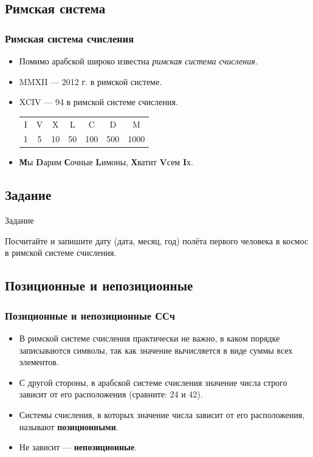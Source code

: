 \documentclass[compress,red]{beamer}
\begin{document}
\subsection{Римская система}
\begin{frame}[fragile]
  \frametitle{Римская система счисления}
  \begin{itemize}
    \item Помимо арабской широко известна \emph{римская система счисления}.
    \item MMXII --- 2012 г. в римской системе.
    \item XCIV --- 94 в римской системе счисления.
    
    \begin{table}
      \begin{tabular}{ccccccc}
      I & V & X & L & C & D & M \\
      1 & 5 & 10 & 50 & 100 & 500 & 1000 \\
      \end{tabular}
    \end{table}
    
    \item \textbf{М}ы \textbf{D}арим \textbf{С}очные \textbf{L}имоны, \textbf{Х}ватит \textbf{V}сем \textbf{I}х.
  \end{itemize}
\end{frame}

\subsection{Задание}
\begin{frame}
  \begin{center}
    \Huge{Задание}
  \end{center}
  \begin{center}
    \Large{Посчитайте и запишите дату (дата, месяц, год) полёта первого человека в космос в римской системе счисления.}
  \end{center}
\end{frame}

\subsection{Позиционные и непозиционные}
\begin{frame}[fragile]
  \frametitle{Позиционные и непозиционные ССч}
  \begin{itemize}
    \item В римской системе счисления практически не важно, в каком порядке записываются символы, так как значение вычисляется в виде суммы всех элементов.
    \item С другой стороны, в арабской системе счисления значение числа строго зависит от его расположения (сравните: 24 и 42).
    \item Системы счисления, в которых значение числа зависит от его расположения, называют \textbf{позиционными}.
    \item Не зависит --- \textbf{непозиционные}.
  \end{itemize}
\end{frame}
\end{document}
